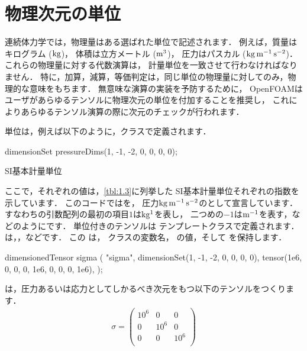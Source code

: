 \section{物理次元の単位}
\label{sec:1.5}
連続体力学では，物理量はある選ばれた単位で記述されます．
例えば，質量はキログラム ($\unit*{kg}$)，
体積は立方メートル ($\unit*{m^{3}}$)，
圧力はパスカル ($\unit*{kg\,m^{-1}\,s^{-2}}$)．
これらの物理量に対する代数演算は，
%
計量単位を一致させて行わなければなりません．
特に，加算，減算，等価判定は，同じ単位の物理量に対してのみ，物理的な意味をもちます．
無意味な演算の実装を予防するために，
%
OpenFOAMはユーザがあらゆるテンソルに物理次元の単位を付加することを推奨し，
これによりあらゆるテンソル演算の際に次元のチェックが行われます．

単位は，例えば以下のように，クラスで定義されます．
\begin{OFverbatim}[terminal]
dimensionSet pressureDims(1, -1, -2, 0, 0, 0, 0);
\end{OFverbatim}


\begin{table}[ht]
 
 \caption{SI基本計量単位}
 \label{tbl:1.3}
\end{table}


ここで，それぞれの値は，\autoref{tbl:1.3}に列挙した
SI基本計量単位それぞれの指数を示しています．
このコードではを，
圧力$\unit*{kg\,m^{-1}\,s^{-2}}$のとして宣言しています．
すなわちの引数配列の最初の項目$1$は$\unit*{kg^{1}}$を表し，
二つめの$-1$は$\unit*{m^{-1}}$を表す，などのようにです．
単位付きのテンソルは
%
テンプレートクラスで定義されます．
は，，などです．
この
%
は，
%
%
クラスの変数名，
の値，そして
%
%
を保持します．

\begin{OFverbatim}[terminal]
dimensionedTensor sigma
    (
        "sigma",
        dimensionSet(1, -1, -2, 0, 0, 0, 0),
        tensor(1e6, 0, 0, 0, 1e6, 0, 0, 0, 1e6),
    );
\end{OFverbatim}
は，圧力あるいは応力としてしかるべき次元をもつ以下のテンソルをつくります．
\begin{align}
 \label{eq:1.45}
 \sigma =
 \begin{pmatrix}
  10^{6} & 0 & 0 \\
  0 & 10^{6} & 0 \\
  0 & 0 & 10^{6} \\
 \end{pmatrix}
\end{align}

